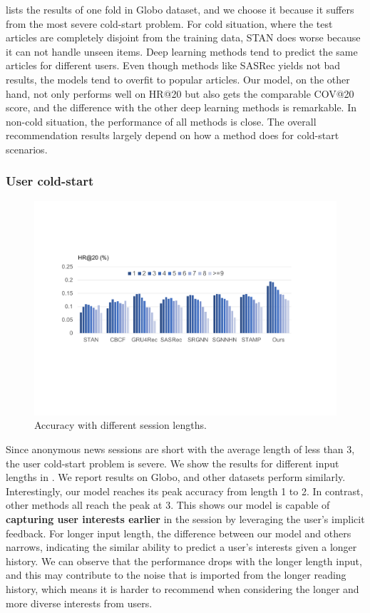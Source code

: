  lists the results of one fold in Globo dataset, and we choose it because it suffers from the most severe cold-start problem. 
For cold situation, where the test articles are completely disjoint from
the training data, STAN does worse because it can not handle unseen items.
Deep learning methods tend to predict the same articles for different users. 
Even though methods like SASRec yields not bad results, 
the models tend to overfit to popular articles. Our model, on the other hand, not only performs well on HR@20 but also gets the comparable COV@20 score, and the difference with the
other deep learning methods is remarkable. 
In non-cold situation, the performance of all methods is close. 
The overall recommendation results largely depend on how a method does for 
cold-start scenarios.

\subsubsection{User cold-start}
\label{sec:usercold}
\begin{figure}[!htp]
  \centering
  \includegraphics[width=0.98\columnwidth]{fig/input_len.pdf}
  \caption{Accuracy with different session lengths.}
  \label{fig:inputlen}
\end{figure}

Since anonymous news sessions are short with the average length of less than 3, 
the user cold-start problem is severe. We show the results for different input lengths in 
. We report results on Globo, and other datasets perform similarly. Interestingly, our model reaches its peak accuracy from length 1 to 2. 
In contrast, other methods all reach the peak at 3.
This shows our model is capable of \textbf{capturing user interests earlier} in the session 
by leveraging the user's implicit feedback. For longer input length, 
the difference between our model and others narrows, 
indicating the similar ability to predict a user's interests given a longer history. We can observe that the performance drops with the longer length input, and this may contribute to the noise that is imported from the longer reading history, which means it is harder to recommend when considering the longer and more diverse interests from users.


